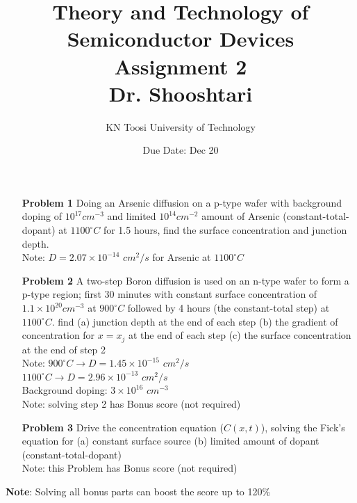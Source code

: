 \documentclass{report}
\title{Theory and Technology of Semiconductor Devices\\ Assignment 2 \\ \vspace{30pt} Dr. Shooshtari}
\author{KN Toosi University of Technology}
\date{Due Date: Dec 20}
\begin{document}
	\maketitle
	
	\begin{enumerate}
		\item[\bf{Problem 1}] Doing an Arsenic diffusion on a p-type wafer with background doping of $10^{17} cm^{-3}$ and limited $10^{14} cm^{-2}$ amount of Arsenic (constant-total-dopant) at $1100^{\circ} C$ for 1.5 hours, find the surface concentration and junction depth. \\
		Note: $D=2.07\times 10^{-14}$ $cm^2/s$ for Arsenic at $1100^{\circ} C$
		
		\item[\bf{Problem 2}] A two-step Boron diffusion is used on an n-type wafer to form a p-type region; first 30 minutes with constant surface concentration of $1.1\times 10^{20} cm^{-3}$ at $900^{\circ} C$ followed by 4 hours (the constant-total step) at $1100^{\circ} C$. find (a) junction depth at the end of each step (b) the gradient of concentration for $x=x_j$ at the end of each step (c) the surface concentration at the end of step 2\\
		Note: $900^{\circ} C \rightarrow D = 1.45\times 10^{-15}$ $cm^{2}/s$ \\
		$1100^{\circ} C \rightarrow D = 2.96\times 10^{-13}$ $cm^{2}/s$ \\
		Background doping: $3\times 10^{16}$ $cm^{-3}$\\
		Note: solving step 2 has Bonus score (not required)
		
		\item[\bf{Problem 3}] Drive the concentration equation ($C(x,t)$), solving the Fick's equation for (a) constant surface source (b) limited amount of dopant (constant-total-dopant) \\
		Note: this Problem has Bonus score (not required)
	\end{enumerate}
	\vspace{120pt}
	\hspace{-35pt} \textbf{Note}: Solving all bonus parts can boost the score up to 120\% 
\end{document}
